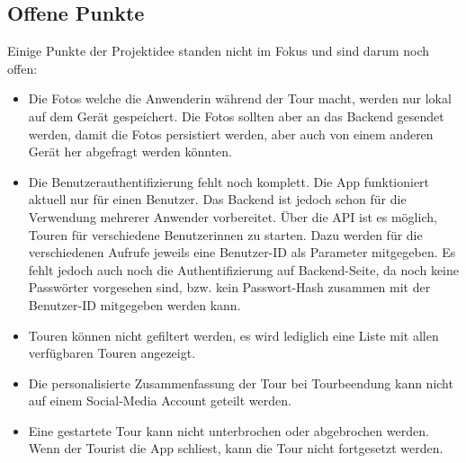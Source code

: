 \subsection{Offene Punkte}
\label{offenePunkte}
Einige Punkte der Projektidee standen nicht im Fokus und sind darum noch offen:
\begin{itemize}
\item Die Fotos welche die Anwenderin während der Tour macht, werden nur lokal auf dem Gerät gespeichert. Die Fotos sollten aber an das Backend gesendet werden, damit die Fotos persistiert werden, aber auch von einem anderen Gerät her abgefragt werden könnten.
\item Die Benutzerauthentifizierung fehlt noch komplett. Die App funktioniert aktuell nur für einen Benutzer. Das Backend ist jedoch schon für die Verwendung mehrerer Anwender vorbereitet. Über die API ist es möglich, Touren für verschiedene Benutzerinnen zu starten. Dazu werden für die verschiedenen Aufrufe jeweils eine Benutzer-ID als Parameter mitgegeben. Es fehlt jedoch auch noch die Authentifizierung auf Backend-Seite, da noch keine Passwörter vorgesehen sind, bzw. kein Passwort-Hash zusammen mit der Benutzer-ID mitgegeben werden kann. 
\item Touren können nicht gefiltert werden, es wird lediglich eine Liste mit allen verfügbaren Touren angezeigt.
\item Die personalisierte Zusammenfassung der Tour bei Tourbeendung kann nicht auf einem Social-Media Account geteilt werden.
\item Eine gestartete Tour kann nicht unterbrochen oder abgebrochen werden. Wenn der Tourist die App schliest, kann die Tour nicht fortgesetzt werden.
\end{itemize}


